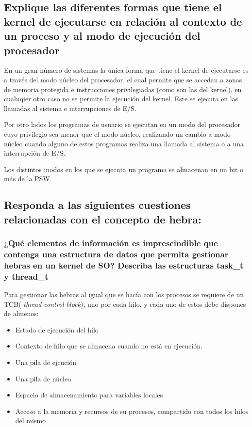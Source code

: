 \documentclass{article}
\begin{document}
			\subsection[Pregunta 4]{Explique las diferentes formas que tiene el kernel de ejecutarse en relación al contexto de un proceso y al modo de ejecución del procesador}
				En un gran número de sistemas la única forma que tiene el kernel de ejecutarse es a través del modo núcleo del procesador, el cual permite que se accedan a zonas de memoria protegida e instrucciones privilegiadas (como son las del kernel), en cualuqier otro caso no se permite la ejecución del kernel. Este se ejecuta en las llamadas al sistema e interrupciones de E/S.
				
				Por otro lados los programas de usuario se ejecutan en un modo del procesador cuyo privilegio sea menor que el modo núcleo, realizando un cambio a modo núcleo cuando alguno de estos programas realiza una llamada al sistema o a una interrupción de E/S. 
				
				Los distintos modos en los que se ejecuta un programa se almacenan en un bit o más de la PSW.
				
			\subsection[Pregunta 5]{Responda a las siguientes cuestiones relacionadas con el concepto de hebra:}
				\subsubsection*{¿Qué elementos de información es imprescindible que contenga una estructura de datos que permita gestionar hebras en un kernel de SO? Describa las estructuras task\_t y thread\_t}
					Para gestionar las hebras al igual que se hacía con los procesos se requiere de un TCB( \textit{thread control block}), uno por cada hilo, y cada uno  de estos debe dispones de almenos:
					
					\begin{itemize}
					\item Estado de ejecución del hilo
					\item Contexto de hilo que se almacena cuando no está en ejecución.
					\item Una pila de ejcución
					\item Una pila de núcleo
					\item Espacio de almacenamiento para variables locales
					\item Acceso a la memoria y recursos de su procesos, compartido con todos los hilos del mismo
					\end{itemize}
				
\end{document}
